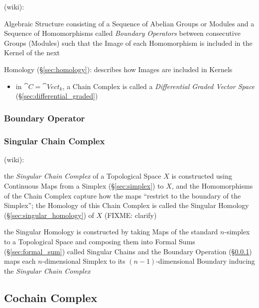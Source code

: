 (wiki):

Algebraic Structure consisting of a Sequence of Abelian Groups or Modules and a
Sequence of Homomorphisms called \emph{Boundary Operators} between consecutive
Groups (Modules) such that the Image of each Homomorphism is included in the
Kernel of the next

\fist Homology (\S\ref{sec:homology}): describes how Images are included in
Kernels

\begin{itemize}
  \item in $\cat{C} = \cat{Vect}_k$, a Chain Complex is called a
    \emph{Differential Graded Vector Space} (\S\ref{sec:differential_graded})
\end{itemize}



\subsubsection{Boundary Operator}\label{sec:boundary_operator}

\subsubsection{Singular Chain Complex}\label{sec:singular_chain_complex}

(wiki):

the \emph{Singular Chain Complex} of a Topological Space $X$ is constructed
using Continuous Maps from a Simplex (\S\ref{sec:simplex}) to $X$, and the
Homomorphisms of the Chain Complex capture how the maps ``restrict to the
boundary of the Simplex''; the Homology of this Chain Complex is called the
Singular Homology (\S\ref{sec:singular_homology}) of $X$ (FIXME: clarify)

the Singular Homology is constructed by taking Maps of the standard $n$-simplex
to a Topological Space and composing them into Formal
Sums (\S\ref{sec:formal_sum}) called Singular Chains and the Boundary Operation
(\S\ref{sec:boundary_operator}) maps each $n$-dimensional Simplex to its
$(n-1)$-dimensional Boundary inducing the \emph{Singular Chain Complex}



\subsection{Cochain Complex}\label{sec:cochain_complex}

